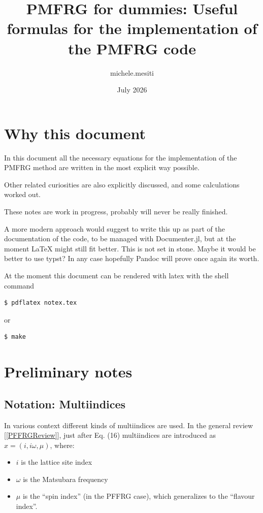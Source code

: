 \documentclass{article}
\title{PMFRG for dummies: Useful formulas for the implementation of the PMFRG code}
\author{michele.mesiti }
\date{July 2026}
\begin{document}
\maketitle

\section{Why this document}

In this document all the necessary equations
for the implementation of the PMFRG method
are written in the most explicit way possible.

Other related curiosities
are also explicitly discussed,
and some calculations worked out.

These notes are work in progress,
probably will never be really finished.

A more modern approach would suggest to write this up
as part of the documentation of the code,
to be managed with Documenter.jl,
but at the moment LaTeX might still fit better.
This is not set in stone.
Maybe it would be better to use typst?
In any case hopefully Pandoc will prove once again its worth.

At the moment this document can be rendered with latex
with the shell command

\begin{lstlisting}
$ pdflatex notex.tex
\end{lstlisting}

or

\begin{lstlisting}
$ make
\end{lstlisting}



\section{Preliminary notes}

\subsection{Notation: Multiindices}
\label{multiindex}

In various context different kinds of multiindices are used.
In the general review [\ref{PFFRGReview}], just after Eq. (16)
multiindices are introduced as $x = (i,i\omega,\mu)$,
where:

\begin{itemize}
\item $i$ is the lattice site index
\item $\omega$ is the Matsubara frequency
\item $\mu$ is the ``spin index'' (in the PFFRG case), which
  generalizes to the ``flavour index''.
\end{itemize}
\end{document}
